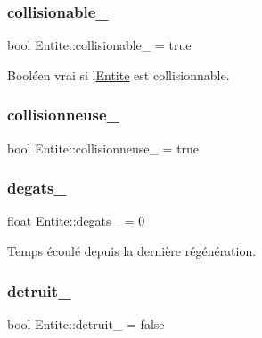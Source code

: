 \subsubsection{\texorpdfstring{collisionable\+\_\+}{collisionable\_}}
{\footnotesize\ttfamily bool Entite\+::collisionable\+\_\+ = true\hspace{0.3cm}{\ttfamily [protected]}}



Booléen vrai si l\textquotesingle{}\hyperlink{class_entite}{Entite} est collisionnable. 

\mbox{\label{class_entite_a0a347fd96077f1f331ed17247840df06}} 
\subsubsection{\texorpdfstring{collisionneuse\+\_\+}{collisionneuse\_}}
{\footnotesize\ttfamily bool Entite\+::collisionneuse\+\_\+ = true\hspace{0.3cm}{\ttfamily [protected]}}

\mbox{\label{class_entite_ac453832772daef8dc6eae431358a8e2a}} 
\subsubsection{\texorpdfstring{degats\+\_\+}{degats\_}}
{\footnotesize\ttfamily float Entite\+::degats\+\_\+ = 0\hspace{0.3cm}{\ttfamily [protected]}}



Temps écoulé depuis la dernière régénération. 

\mbox{\label{class_entite_a2d98d6fac9fb85da156fcda84fcec3ac}} 
\subsubsection{\texorpdfstring{detruit\+\_\+}{detruit\_}}
{\footnotesize\ttfamily bool Entite\+::detruit\+\_\+ = false\hspace{0.3cm}{\ttfamily [protected]}}



